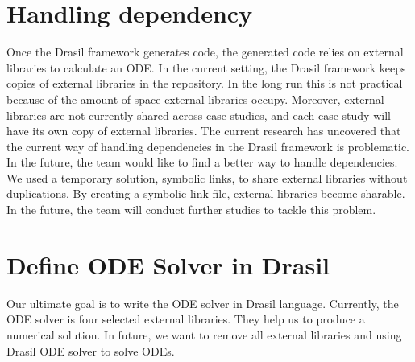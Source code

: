 \section{Handling dependency}
Once the Drasil framework generates code, the generated code relies on external libraries to calculate an ODE. In the current setting, the Drasil framework keeps copies of external libraries in the repository. In the long run this is not practical because of the amount of space external libraries occupy. Moreover, external libraries are not currently shared across case studies, and each case study will have its own copy of external libraries. The current research has uncovered that the current way of handling dependencies in the Drasil framework is problematic. In the future, the team would like to find a better way to handle dependencies. We used a temporary solution, symbolic links, to share external libraries without duplications. By creating a symbolic link file, external libraries become sharable. In the future, the team will conduct further studies to tackle this problem.

\section{Define ODE Solver in Drasil}
Our ultimate goal is to write the ODE solver in Drasil language. Currently, the ODE solver is four selected external libraries. They help us to produce a numerical solution. In future, we want to remove all external libraries and using Drasil ODE solver to solve ODEs. 

